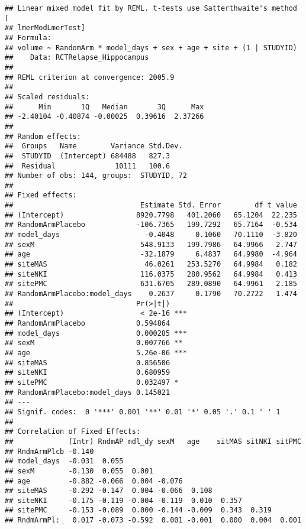 \documentclass[]{article}
\theoremstyle{definition}
\theoremstyle{definition}
\theoremstyle{definition}
\theoremstyle{remark}
\begin{document}
\begin{verbatim}
## Linear mixed model fit by REML. t-tests use Satterthwaite's method [
## lmerModLmerTest]
## Formula: 
## volume ~ RandomArm * model_days + sex + age + site + (1 | STUDYID)
##    Data: RCTRelapse_Hippocampus
## 
## REML criterion at convergence: 2005.9
## 
## Scaled residuals: 
##      Min       1Q   Median       3Q      Max 
## -2.40104 -0.40874 -0.00025  0.39616  2.37266 
## 
## Random effects:
##  Groups   Name        Variance Std.Dev.
##  STUDYID  (Intercept) 684488   827.3   
##  Residual              10111   100.6   
## Number of obs: 144, groups:  STUDYID, 72
## 
## Fixed effects:
##                              Estimate Std. Error        df t value
## (Intercept)                 8920.7798   401.2060   65.1204  22.235
## RandomArmPlacebo            -106.7365   199.7292   65.7164  -0.534
## model_days                    -0.4048     0.1060   70.1110  -3.820
## sexM                         548.9133   199.7986   64.9966   2.747
## age                          -32.1879     6.4837   64.9980  -4.964
## siteMAS                       46.0261   253.5270   64.9984   0.182
## siteNKI                      116.0375   280.9562   64.9984   0.413
## sitePMC                      631.6705   289.0890   64.9961   2.185
## RandomArmPlacebo:model_days    0.2637     0.1790   70.2722   1.474
##                             Pr(>|t|)    
## (Intercept)                  < 2e-16 ***
## RandomArmPlacebo            0.594864    
## model_days                  0.000285 ***
## sexM                        0.007766 ** 
## age                         5.26e-06 ***
## siteMAS                     0.856506    
## siteNKI                     0.680959    
## sitePMC                     0.032497 *  
## RandomArmPlacebo:model_days 0.145021    
## ---
## Signif. codes:  0 '***' 0.001 '**' 0.01 '*' 0.05 '.' 0.1 ' ' 1
## 
## Correlation of Fixed Effects:
##             (Intr) RndmAP mdl_dy sexM   age    sitMAS sitNKI sitPMC
## RndmArmPlcb -0.140                                                 
## model_days  -0.031  0.055                                          
## sexM        -0.130  0.055  0.001                                   
## age         -0.882 -0.066  0.004 -0.076                            
## siteMAS     -0.292 -0.147  0.004 -0.066  0.108                     
## siteNKI     -0.175 -0.119 -0.004 -0.119  0.010  0.357              
## sitePMC     -0.153 -0.089  0.000 -0.144 -0.009  0.343  0.319       
## RndmArmPl:_  0.017 -0.073 -0.592  0.001 -0.001  0.000  0.004  0.001
\end{verbatim}
\end{document}
